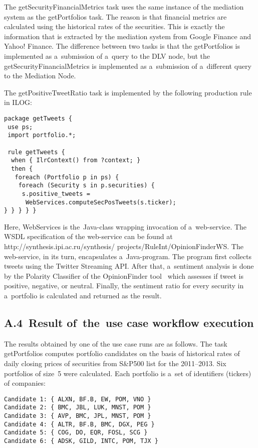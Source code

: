\begin{multicols}{2}
{  The {\sf getSecurityFinancialMetrics} task uses the same instance of the
mediation system as the {\sf getPortfolios} task. The reason is that financial
metrics are calculated using the historical rates of the securities. This is exactly the
information that is extracted by the mediation system from {Google Finance}
and {Yahoo! Finance}. The difference between two tasks is that the
{\sf getPortfolios} is implemented as a~submission of a~query to the DLV node, but
the {\sf getSecurityFinancialMetrics} is implemented as a~submission of a~different
query to the Mediation Node.

  The {\sf getPositiveTweetRatio} task is implemented by the following
production rule in ILOG:


\noindent
  \begin{verbatim}
package getTweets {
 use ps;
 import portfolio.*;

 rule getTweets {
  when { IlrContext() from ?context; }
  then {
   foreach (Portfolio p in ps) {
    foreach (Security s in p.securities) {
     s.positive_tweets =
      WebServices.computeSecPosTweets(s.ticker);
} } } } }
\end{verbatim}




\noindent
Here, {\sf WebServices} is the~Java-class wrapping invocation of a~web-service.
The WSDL specification of the web-service can be found at {\sf
http://synthesis.ipi.ac.ru/synthesis/ projects/RuleInt/OpinionFinderWS}. The
  web-service, in its turn, encapsulates a~Java-program. The program first collects
tweets using the {\sf Twitter Streaming API}. After that, a~sentiment analysis is
done by the {\sf Polarity Classifier} of the {\sf OpinionFinder}
  tool~\cite{14-kal} which assesses if tweet is positive, negative, or neutral. Finally,
the sentiment ratio for every security in a~portfolio is calculated and returned as the
result.

\vspace*{-6pt}

\subsection*{A.4\	Result of~the~use case workflow execution}

  \noindent
  The results obtained by one of the use case runs are as follows. The task
{\sf getPortfolios} computes portfolio candidates on the basis of historical rates of
daily closing prices of securities from S\&P500 list for the 2011--2013. Six portfolios
of size~5 were calculated. Each portfolio is a~set of identifiers (tickers) of
companies:
  \begin{verbatim}
Candidate 1: { ALXN, BF.B, EW, POM, VNO }
Candidate 2: { BMC, JBL, LUK, MNST, POM }
Candidate 3: { AVP, BMC, JPL, MNST, POM }
Candidate 4: { ALTR, BF.B, BMC, DGX, PEG }
Candidate 5: { COG, DO, EQR, FOSL, SCG }
Candidate 6: { ADSK, GILD, INTC, POM, TJX }
\end{verbatim}

}
\end{multicols}

